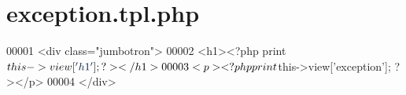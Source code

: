 \hypertarget{exception_8tpl_8php}{\section{exception.\-tpl.\-php}
\label{exception_8tpl_8php}
}

\begin{DoxyCode}
00001       <div \textcolor{keyword}{class}=\textcolor{stringliteral}{"jumbotron"}>
00002         <h1><?php print $this->view[\textcolor{stringliteral}{'h1'}]; ?></h1>
00003         <p><?php print $this->view[\textcolor{stringliteral}{'exception'}]; ?></p>
00004       </div>
\end{DoxyCode}
